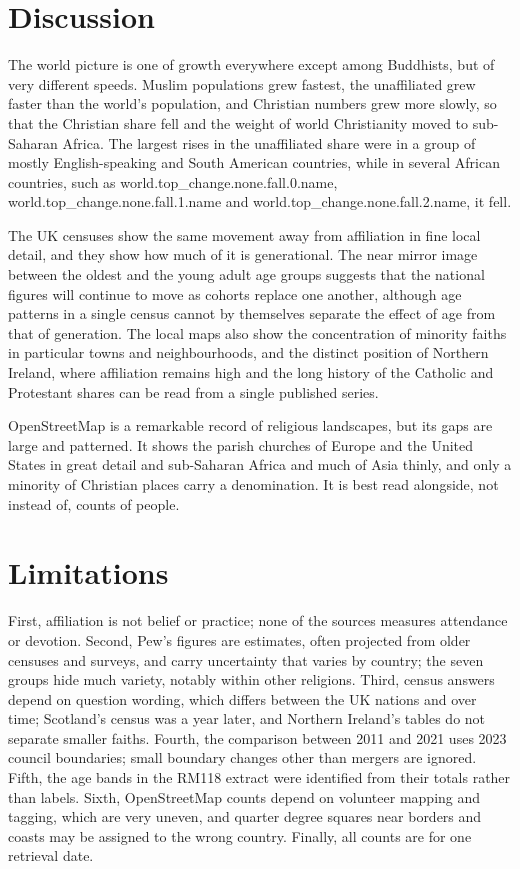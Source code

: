 \documentclass[11pt,a4paper]{article}
\begin{document}
\section{Discussion}
The world picture is one of growth everywhere except among Buddhists, but of very different speeds. Muslim populations grew fastest, the unaffiliated grew faster than the world's population, and Christian numbers grew more slowly, so that the Christian share fell and the weight of world Christianity moved to sub-Saharan Africa. The largest rises in the unaffiliated share were in a group of mostly English-speaking and South American countries, while in several African countries, such as {{world.top_change.none.fall.0.name}}, {{world.top_change.none.fall.1.name}} and {{world.top_change.none.fall.2.name}}, it fell.

The UK censuses show the same movement away from affiliation in fine local detail, and they show how much of it is generational. The near mirror image between the oldest and the young adult age groups suggests that the national figures will continue to move as cohorts replace one another, although age patterns in a single census cannot by themselves separate the effect of age from that of generation. The local maps also show the concentration of minority faiths in particular towns and neighbourhoods, and the distinct position of Northern Ireland, where affiliation remains high and the long history of the Catholic and Protestant shares can be read from a single published series.

OpenStreetMap is a remarkable record of religious landscapes, but its gaps are large and patterned. It shows the parish churches of Europe and the United States in great detail and sub-Saharan Africa and much of Asia thinly, and only a minority of Christian places carry a denomination. It is best read alongside, not instead of, counts of people.

\section{Limitations}
First, affiliation is not belief or practice; none of the sources measures attendance or devotion. Second, Pew's figures are estimates, often projected from older censuses and surveys, and carry uncertainty that varies by country; the seven groups hide much variety, notably within other religions. Third, census answers depend on question wording, which differs between the UK nations and over time; Scotland's census was a year later, and Northern Ireland's tables do not separate smaller faiths. Fourth, the comparison between 2011 and 2021 uses 2023 council boundaries; small boundary changes other than mergers are ignored. Fifth, the age bands in the RM118 extract were identified from their totals rather than labels. Sixth, OpenStreetMap counts depend on volunteer mapping and tagging, which are very uneven, and quarter degree squares near borders and coasts may be assigned to the wrong country. Finally, all counts are for one retrieval date.
\end{document}
